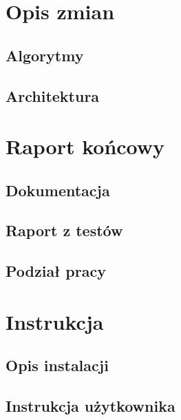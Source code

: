 	\chapter{Opis zmian}\label{chap:opis zmian}
	\section{Algorytmy}\label{sec:algorytmy}
	
	\section{Architektura}\label{sec:architektura-zmiany}
	

	\chapter{Raport końcowy}\label{chap:raport końcowy}
	\section{Dokumentacja}\label{sec:dokumentacja}
	
	\section{Raport z testów}\label{sec:raport z testów}
	
	\section{Podział pracy}\label{sec:podzial}
	
	

	\chapter{Instrukcja}\label{chap:instrukcja}
	\section{Opis instalacji}\label{sec:instrukcja użytkownika}
	
	\section{Instrukcja użytkownika}\label{sec:instrukcja użytkownika}
	

	

	\newpage
	
	\newpage



